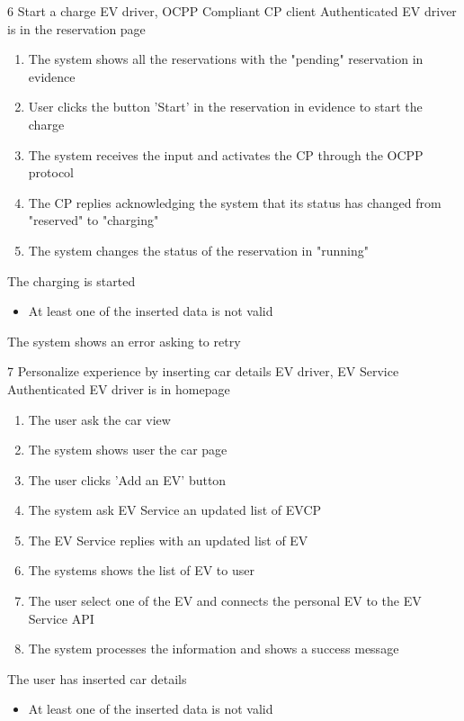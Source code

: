 \usecase
{6}
{Start a charge}
{EV driver, OCPP Compliant CP client}
{Authenticated EV driver is in the reservation page}
{
    \begin{enumerate}
        \item The system shows all the reservations with the "pending" reservation in evidence
        \item User clicks the button 'Start' in the reservation in evidence to start the charge
        \item The system receives the input and activates the CP through the OCPP protocol
        \item The CP replies acknowledging the system that its status has changed from "reserved" to "charging"
        \item The system changes the status of the reservation in "running"
    \end{enumerate}
}
{The charging is started}
{
    \begin{itemize}
        \item At least one of the inserted data is not valid
    \end{itemize}
}
{
    The system shows an error asking to retry
}

\usecase
{7}
{Personalize experience by inserting car details}
{EV driver, EV Service}
{Authenticated EV driver is in homepage}
{
    \begin{enumerate}
        \item The user ask the car view
        \item The system shows user the car page
        \item The user clicks 'Add an EV' button
        \item The system ask EV Service an updated list of EVCP
        \item The EV Service replies with an updated list of EV
        \item The systems shows the list of EV to user
        \item The user select one of the EV and connects the personal EV to the EV Service API
        \item The system processes the information and shows a success message
    \end{enumerate}
}
{The user has inserted car details}
{
    \begin{itemize}
        \item At least one of the inserted data is not valid
    \end{itemize}
}
{
}

